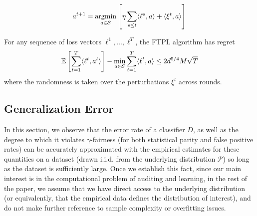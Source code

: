 \begin{algorithm}[h]
  \caption{Follow the Perturbed Leader (FTPL) Algorithm}
 \label{alg:ftpl}
  \begin{algorithmic}
     


    \[
      a^{t+1} = \operatorname*{\mathrm{argmin}}_{a\in \mathcal{S}} \left[ \eta \sum_{s \leq t} \langle
        \ell^s , a \rangle + \langle \xi^t , a \rangle\right]
    \]
    \end{algorithmic}
  \end{algorithm}


  \begin{theorem}[\cite{KV05}]\label{thm:ftpl-regret}
    For any sequence of loss vectors $\ell^1, \ldots , \ell^T$, the
    FTPL algorithm has regret
    \[
      \operatorname*{\mathbb{E}}_{}\left[\sum_{t=1}^T \langle \ell^t , a^t \rangle \right] - \min_{a\in
        \mathcal{S}} \sum_{t=1}^T \langle \ell^t, a \rangle \leq 2 d^{5/4}
      M\sqrt{T}
    \]
    where the randomness is taken over the perturbations $\xi^t$ across
    rounds.
  \end{theorem}





\subsection{Generalization Error}
\label{subsec:gen}
In this section, we observe that the error rate of a classifier $D$,
as well as the degree to which it violates $\gamma$-fairness (for both
statistical parity and false positive rates) can be accurately
approximated with the empirical estimates for these quantities on a
dataset (drawn i.i.d. from the underlying distribution $\mathcal{P}$)
so long as the dataset is sufficiently large. Once we establish this
fact, since our main interest is in the computational problem of
auditing and learning, in the rest of the paper, we assume that we
have direct access to the underlying distribution (or equivalently,
that the empirical data defines the distribution of interest), and do
not make further reference to sample complexity or overfitting issues.



